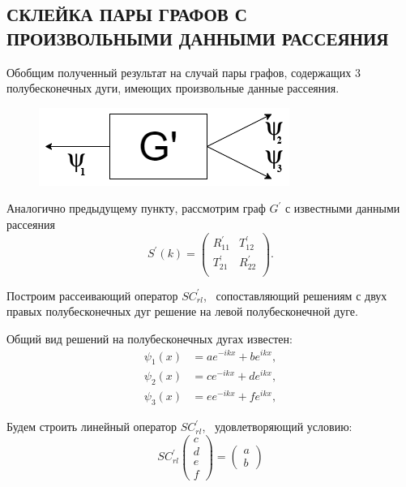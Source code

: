 \documentclass[a4 paper, 12 pt]{extarticle}
\begin{document}
   \subsection{СКЛЕЙКА ПАРЫ ГРАФОВ С ПРОИЗВОЛЬНЫМИ ДАННЫМИ РАССЕЯНИЯ}
   
   Обобщим полученный результат на случай пары графов, содержащих 3 полубесконечных дуги, имеющих произвольные данные рассеяния.
   
   \begin{figure}[!htb]
   	\centering
   	\includegraphics[scale=0.5]{g_prime.png}
   \end{figure}
   
   Аналогично предыдущему пункту, рассмотрим граф $G^\prime$ с известными данными рассеяния 
   \[
      S^\prime(k)=\left(%
   \begin{array}{cc}
   R_{11}^\prime & T_{12}^\prime \\
   T_{21}^\prime & R_{22}^\prime \\
   \end{array}%
   \right).
   \]
   
   Построим рассеивающий оператор $SC_{rl}^\prime$, \ сопоставляющий решениям с двух правых полубесконечных дуг решение на левой полубесконечной дуге.
   
   Общий вид решений на полубесконечных дугах известен:
   \begin{equation}
   \label{GeneralizedSolution1}
   \begin{split}
   \psi_1\left(x\right) &= a e^{-ikx} + b e^{ikx}, \\
   \psi_2\left(x\right) &= c e^{-ikx} + d e^{ikx}, \\
   \psi_3\left(x\right) &= e e^{-ikx} + f e^{ikx},
   \end{split}
   \end{equation}
   
   Будем строить линейный оператор $SC_{rl}^\prime$, \ удовлетворяющий условию:
   \[SC_{rl}^\prime\left(
   \begin{array}{c}
   c \\
   d \\
   e \\
   f
   \end{array}\right) = \left(\begin{array}{c}
   a \\
   b
   \end{array}\right)\]
   
\end{document}
